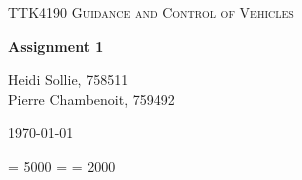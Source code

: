 \documentclass[12pt,a4paper]{article}
\title{\MyFag}
\title{\MyTitle{}}
\date{\today}
\author{}
\begin{document}
\begin{titlepage}
	\centering
	\vspace{1cm}
	{\scshape\Large TTK4190 Guidance and Control of Vehicles\par}
	\vspace{1.5cm}
	{\huge\bfseries Assignment 1\par}
	\vspace{2cm}
	{\Large Heidi Sollie, 758511\\Pierre Chambenoit, 759492\par}
    \vfill
	{\large \today\par}
\end{titlepage}

\tolerance = 5000
\hbadness = \tolerance
\pretolerance = 2000



\newpage
\setcounter{page}{1}









\end{document}
